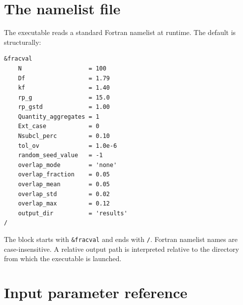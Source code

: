 \documentclass[11pt,oneside]{report}
\newcommand{\code}[1]{\texttt{#1}}
\begin{document}
\section{The namelist file}

The executable reads a standard Fortran namelist at runtime. The default
 is structurally:

\begin{lstlisting}
&fracval
    N                   = 100
    Df                  = 1.79
    kf                  = 1.40
    rp_g                = 15.0
    rp_gstd             = 1.00
    Quantity_aggregates = 1
    Ext_case            = 0
    Nsubcl_perc         = 0.10
    tol_ov              = 1.0e-6
    random_seed_value   = -1
    overlap_mode        = 'none'
    overlap_fraction    = 0.05
    overlap_mean        = 0.05
    overlap_std         = 0.02
    overlap_max         = 0.12
    output_dir          = 'results'
/
\end{lstlisting}

The block starts with \code{\&fracval} and ends with \code{/}. Fortran namelist
names are case-insensitive. A relative output path is interpreted relative to
the directory from which the executable is launched.

\section{Input parameter reference}
\end{document}
